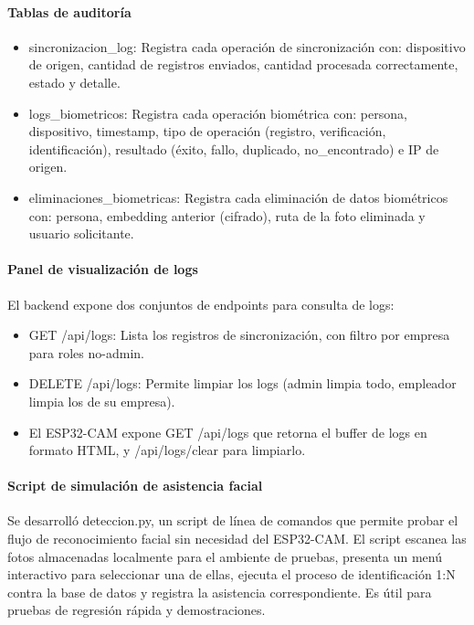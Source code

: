 \paragraph{Tablas de auditoría}

\begin{itemize}
    \item sincronizacion\_log: Registra cada operación de sincronización con: dispositivo de origen, cantidad de registros enviados, cantidad procesada correctamente, estado y detalle.
    \item logs\_biometricos: Registra cada operación biométrica con: persona, dispositivo, timestamp, tipo de operación (registro, verificación, identificación), resultado (éxito, fallo, duplicado, no\_encontrado) e IP de origen.
    \item eliminaciones\_biometricas: Registra cada eliminación de datos biométricos con: persona, embedding anterior (cifrado), ruta de la foto eliminada y usuario solicitante.
\end{itemize}

\paragraph{Panel de visualización de logs}

El backend expone dos conjuntos de endpoints para consulta de logs:
\begin{itemize}
    \item GET /api/logs: Lista los registros de sincronización, con filtro por empresa para roles no-admin.
    \item DELETE /api/logs: Permite limpiar los logs (admin limpia todo, empleador limpia los de su empresa).
    \item El ESP32-CAM expone GET /api/logs que retorna el buffer de logs en formato HTML, y /api/logs/clear para limpiarlo.
\end{itemize}

\paragraph{Script de simulación de asistencia facial}

Se desarrolló deteccion.py, un script de línea de comandos que permite probar el flujo de reconocimiento facial sin necesidad del ESP32-CAM. El script escanea las fotos almacenadas localmente para el ambiente de pruebas, presenta un menú interactivo para seleccionar una de ellas, ejecuta el proceso de identificación 1:N contra la base de datos y registra la asistencia correspondiente. Es útil para pruebas de regresión rápida y demostraciones.

